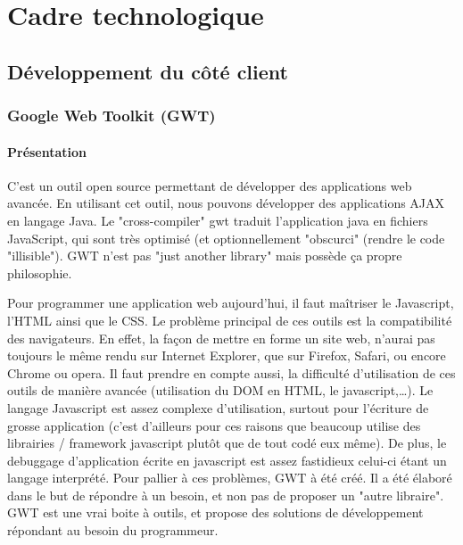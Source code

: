 
\chapter{Cadre technologique}


\section{Développement du côté client}
\subsection{Google Web Toolkit (GWT)}

\subsubsection{Présentation}
C'est un outil open source permettant de développer des applications web avancée. En utilisant cet outil, nous pouvons développer des applications AJAX en langage Java. 
Le "cross-compiler" gwt traduit l'application java en fichiers JavaScript, qui sont très optimisé (et optionnellement "obscurci" (rendre le code "illisible").
GWT n'est pas "just another library" mais possède ça propre philosophie.

Pour programmer une application web aujourd'hui, il faut maîtriser le Javascript, l'HTML ainsi que le CSS. Le problème principal de ces outils est la compatibilité des navigateurs. En effet, la façon de mettre en forme un site web, n'aurai pas toujours le même rendu sur Internet Explorer, que sur Firefox, Safari, ou encore Chrome ou opera. Il faut prendre en compte aussi, la difficulté d'utilisation de ces outils de manière avancée (utilisation du DOM en HTML, le javascript,…). Le langage Javascript est assez complexe d'utilisation, surtout pour l'écriture de grosse application (c'est d'ailleurs pour ces raisons que beaucoup utilise des librairies / framework javascript plutôt que de tout codé eux même). De plus, le debuggage d'application écrite en javascript est assez fastidieux celui-ci étant un langage interprété. Pour pallier à ces problèmes, GWT à été créé. Il a été élaboré dans le but de répondre à un besoin, et non pas de proposer un "autre libraire". GWT est une vrai boite à outils, et propose des solutions de développement répondant au besoin du programmeur.


